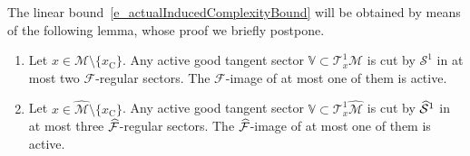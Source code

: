 \documentclass[AHL, Unicode, longabstracts,published]{cedram}
\newcommand{\crit}{\mathrm{C}}
\newcommand{\xc}{x_\crit}
\newcommand{\tangu}{\mathcal{T}^1}
\newcommand{\cm}{\mathcal{F}}
\newcommand{\csp}{\mathcal{M}}
\newcommand{\cmp}{\hat\cm}
\newcommand{\cspi}{\widehat{\csp}}
\newcommand{\singPrivate}{\mathcal{S}}
\newcommand{\sing}[1]{\singPrivate^{#1}}
\newcommand{\singp}[1]{\hat{\singPrivate}^{#1}}
\newcommand{\cV}{\mathbb{V}}
\newcommand*{\relabel}{\renewcommand{\labelenumi}{(\theenumi)}}
\newcommand*{\alphenumi}{\renewcommand*{\theenumi}{\alph{enumi}}\relabel}
\let\oldhat\hat
\renewcommand*{\hat}[1]{\mathchoice{\widehat{#1}}{\widehat{#1}}{\oldhat{#1}}{\oldhat{#1}}}
\begin{document}
The linear bound~\eqref{e_actualInducedComplexityBound} will be obtained by means of the following lemma, whose proof we briefly postpone.

\pagebreak
\begin{lemm}\label{l_inductiveStep}
\leavevmode
\begin{enumerate}\alphenumi
\item \label{i_inductiveStep}
Let $x\in\csp\setminus\{\xc\}$. Any active good tangent sector $\cV\subset\tangu_x\csp$ is cut by $\sing1$ in at most two $\cm$-regular sectors. The $\cm$-image of at most one of them is active.
\item \label{i_inducedInductiveStep}
Let $x\in\cspi\setminus\{\xc\}$. Any active good tangent sector $\cV\subset\tangu_x\cspi$ is cut by $\singp1$ in at most three $\cmp$-regular sectors. The $\cmp$-image of at most one of them is active.
\end{enumerate}
\end{lemm} 
\end{document}
